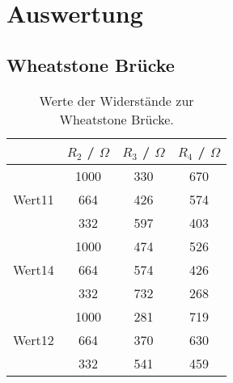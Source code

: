 \section{Auswertung}
\label{sec:Auswertung}

\subsection{Wheatstone Brücke}
\begin{table}[H]
    \centering
    \caption{Werte der Widerstände zur Wheatstone Brücke.}
    \label{tab:t1}
    \begin{tabular}{|l|c|c|c|}
        \hline
        & \textbf{$R_2$ / $\Omega$} & \textbf{$R_3$ / $\Omega$} & \textbf{$R_4$ / $\Omega$} \\
        \hline
        \hline
               & 1000 & 330 & 670 \\
        Wert11 & 664  & 426 & 574 \\
               & 332  & 597 & 403 \\
        \hline
        \hline
               & 1000 & 474 & 526 \\
        Wert14 & 664  & 574 & 426 \\
               & 332  & 732 & 268 \\
        \hline
        \hline
               & 1000 & 281 & 719 \\
        Wert12 & 664  & 370 & 630 \\
               & 332  & 541 & 459 \\
        \hline
    \end{tabular}
\end{table}



